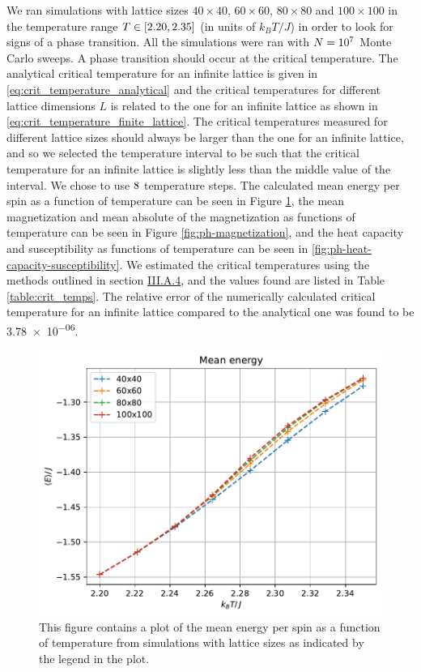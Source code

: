 \documentclass[reprint,english,notitlepage]{revtex4-1}  %
\begin{document}
We ran simulations with lattice sizes $40\times 40$, $60 \times 60$, $80 \times 80$ and $100 \times 100$ in the temperature range $T\in[2.20 ,2.35 ]$ (in units of $k_B T/J$) in order to look for signs of a phase transition. All the simulations were ran with $N=10^7$ Monte Carlo sweeps. A phase transition should occur at the critical temperature. The analytical critical temperature for an infinite lattice is given in \eqref{eq:crit_temperature_analytical} and the critical temperatures for different lattice dimensions $L$ is related to the one for an infinite lattice as shown in \eqref{eq:crit_temperature_finite_lattice}. The critical temperatures measured for different lattice sizes should always be larger than the one for an infinite lattice, and so we selected the temperature interval to be such that the critical temperature for an infinite lattice is slightly less than the middle value of the interval. We chose to use $8$ temperature steps. The calculated mean energy per spin as a function of temperature can be seen in Figure \ref{fig:ph-energy}, the mean magnetization and mean absolute of the magnetization as functions of temperature can be seen in Figure \ref{fig:ph-magnetization}, and the heat capacity and susceptibility as functions of temperature can be seen in \ref{fig:ph-heat-capacity-susceptibility}. We estimated the critical temperatures using the methods outlined in section \hyperref[sec:III:A.iv]{III.A.4}, and the values found are listed in Table \ref{table:crit_temps}. The relative error of the numerically calculated critical temperature for an infinite lattice compared to the analytical one was found to be \num{3.78e-06}.


\begin{figure}[H]
\centering
\includegraphics[width=\columnwidth]{../data/phase-transition-E.pdf}
\caption{This figure contains a plot of the mean energy per spin as a function of temperature from simulations with lattice sizes as indicated by the legend in the plot.} \label{fig:ph-energy}
\end{figure}
\end{document}
